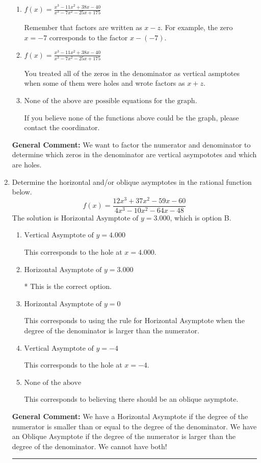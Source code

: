 \documentclass{extbook}[14pt]
\newcommand{\litem}[1]{\item #1

\rule{\textwidth}{0.4pt}}
\begin{document}
\begin{enumerate}
{\begin{enumerate}[label=\Alph*.]
This is the correct answer!
\item \( f(x)=\frac{x^{3} -11 x^{2} +38 x -40}{x^{3} -7 x^{2} -25 x + 175} \)

Remember that factors are written as $x-z$. For example, the zero $x=-7$ corresponds to the factor $x-(-7)$.
\item \( f(x)=\frac{x^{3} -11 x^{2} +38 x -40}{x^{3} -7 x^{2} -25 x + 175} \)

You treated all of the zeros in the denominator as vertical asmptotes when some of them were holes and wrote factors as $x+z$.
\item \( \text{None of the above are possible equations for the graph.} \)

If you believe none of the functions above could be the graph, please contact the coordinator.
\end{enumerate}

\textbf{General Comment:} We want to factor the numerator and denominator to determine which zeros in the denominator are vertical asympototes and which are holes.
}
\litem{
Determine the horizontal and/or oblique asymptotes in the rational function below.
\[ f(x) = \frac{12x^{3} +37 x^{2} -59 x -60}{4x^{3} -10 x^{2} -64 x -48} \]The solution is \( \text{Horizontal Asymptote of } y = 3.000  \), which is option B.\begin{enumerate}[label=\Alph*.]
\item \( \text{Vertical Asymptote of } y = 4.000  \)

This corresponds to the hole at $x = 4.000$.
\item \( \text{Horizontal Asymptote of } y = 3.000  \)

* This is the correct option.
\item \( \text{Horizontal Asymptote of } y = 0  \)

This corresponds to using the rule for Horizontal Asymptote when the degree of the denominator is larger than the numerator.
\item \( \text{Vertical Asymptote of } y = -4  \)

This corresponds to the hole at $x = -4$.
\item \( \text{None of the above} \)

This corresponds to believing there should be an oblique asymptote.
\end{enumerate}

\textbf{General Comment:} We have a Horizontal Asymptote if the degree of the numerator is smaller than or equal to the degree of the denominator. We have an Oblique Asymptote if the degree of the numerator is larger than the degree of the denominator. We cannot have both!
}
\end{enumerate}
\end{document}
